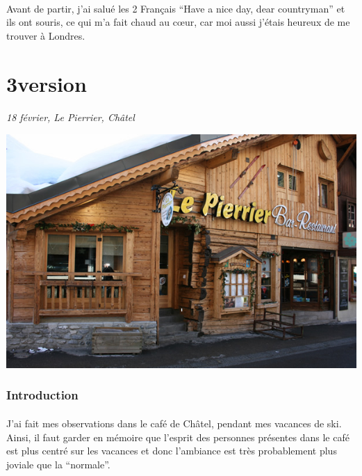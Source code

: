 \paragraph{} Avant de partir, j'ai salué les 2 Français ``Have a nice day, dear
countryman'' et ils ont souris, ce qui m'a fait chaud au cœur, car moi aussi
j'étais heureux de me trouver à Londres.

\section{3\ieme version}

\paragraph{}
\emph{18 février, Le Pierrier, Châtel}

\begin{center}
	\includegraphics[scale=0.5]{pierrier.jpg}
\end{center}

\subsubsection{Introduction}

\paragraph{} J'ai fait mes observations dans le café de Châtel, pendant mes
vacances de ski.  Ainsi, il faut garder en mémoire que l'esprit des personnes
présentes dans le café est plus centré sur les vacances et donc l'ambiance est
très probablement plus joviale que la ``normale''.

